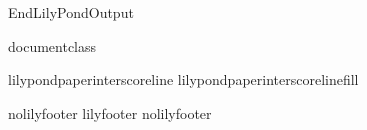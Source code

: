 %
\def\ifundefined#1{\expandafter\ifx\csname#1\endcsname\relax}
%
\ifx\mustmakelilypondtitle\undefined\else\makelilypondtitle\fi
\ifx\mustmakelilypondpiecetitle\undefined\else\makelilypondpiecetitle\fi
%
\def\SkipLilydefs{\endinput}
\ifundefined{EndLilyPondOutput}
        \def\EndLilyPondOutput{\csname bye\endcsname}
        \def\SkipLilydefs{}
\fi
\SkipLilydefs

\ifundefined{documentclass}
        
\else
        
\fi


%
\def\botalign#1{\vbox to 0pt{\vss #1}}
\def\leftalign#1{\hbox to 0pt{#1\hss}}



\def\myfilbreak{\par\vfil\penalty200\vfilneg}

\ifundefined{lilypondpaperinterscoreline}
        \def\lilypondpaperinterscoreline{16}
\fi
\ifundefined{lilypondpaperinterscorelinefill}
        \def\lilypondpaperinterscorelinefill{0}
\fi

\def\interscoreline{\vskip\lilypondpaperinterscoreline pt plus %
  \lilypondpaperinterscorelinefill fill}

\def\placebox#1#2#3{%
        \botalign{\hbox{\raise #1\leftalign{\kern #2{}#3}}}}%

\ifx\pdfoutput\undefined  
  
\else
  
\fi

\def\EndLilyPondOutput{%
 \vskip 0pt plus \lilypondpaperinterscorelinefill00 fill\csname bye\endcsname
}
\def\postheader{}


\ifx\csname nolilyfooter\endcsname\relax
        \csname lilyfooter\texsuffix\endcsname%
\else
        \csname%
        nolilyfooter\texsuffix\endcsname
\fi

\endinput
